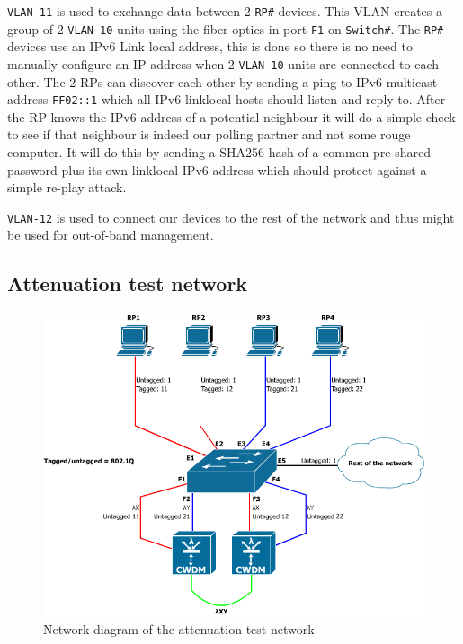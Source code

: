 \documentclass{article}
\begin{document}
\texttt{VLAN-11} is used to exchange data between 2 \texttt{RP\#} devices. This VLAN creates a group of 2 \texttt{VLAN-10} units using the fiber optics in port \texttt{F1} on \texttt{Switch\#}. The \texttt{RP\#} devices use an IPv6 Link local address, this is done so there is no need to manually configure an IP address when 2 \texttt{VLAN-10} units are connected to each other. The 2 RPs can discover each other by sending a ping to IPv6 multicast address \texttt{FF02::1} which all IPv6 linklocal hosts should listen and reply to\cite{ietf:rfc4291}. After the RP knows the IPv6 address of a potential neighbour it will do a simple check to see if that neighbour is indeed our polling partner and not some rouge computer. It will do this by sending a SHA256 hash of a common pre-shared password plus its own linklocal IPv6 address which should protect against a simple re-play attack.

\texttt{VLAN-12} is used to connect our devices to the rest of the network and thus might be used for out-of-band management.


\subsection{Attenuation test network}

\begin{figure}[h]
\centerline{\includegraphics[scale=0.4, trim = 0mm 0mm 0mm 0mm]{images/CWDM.png}}
\caption{Network diagram of the attenuation test network}
\label{fig:CWDM}
\end{figure}
\end{document}
